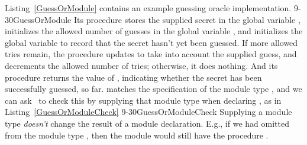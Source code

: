 Listing~\ref{GuessOrModule} contains an example guessing oracle
implementation.   {9-30}{GuessOrModule} Its  procedure stores
the supplied secret in the global variable , initializes the
allowed number of guesses in the global variable , and
initializes the  global variable to record that the secret
hasn't yet been guessed.  If more allowed tries remain, the 
procedure updates  to take into account the supplied
guess, and decrements the allowed number of tries; otherwise, it does
nothing.  And its  procedure returns the value of
, indicating whether the secret has been successfully
guessed, so far.  matches the specification of the module type
, and we can ask \EasyCrypt\ to check this by supplying that
module type when declaring , as in
Listing~\ref{GuessOrModuleCheck}
 {9-30}{GuessOrModuleCheck} Supplying a module
type \emph{doesn't} change the result of a module declaration. E.g.,
if we had omitted  from the module type , then the
module  would still have the procedure .

